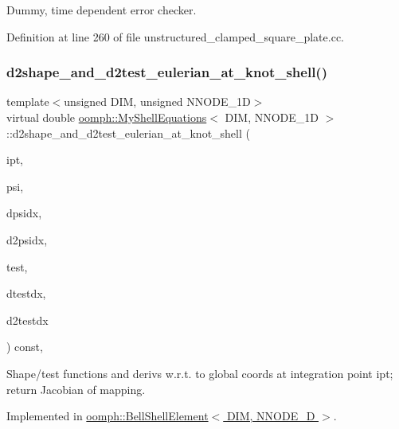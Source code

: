 Dummy, time dependent error checker. 



Definition at line 260 of file unstructured\+\_\+clamped\+\_\+square\+\_\+plate.\+cc.

\mbox{\label{classoomph_1_1MyShellEquations_af8f15f0d678c85535bbc3390399dafdd}} 
\subsubsection{\texorpdfstring{d2shape\+\_\+and\+\_\+d2test\+\_\+eulerian\+\_\+at\+\_\+knot\+\_\+shell()}{d2shape\_and\_d2test\_eulerian\_at\_knot\_shell()}}
{\footnotesize\ttfamily template$<$unsigned D\+IM, unsigned N\+N\+O\+D\+E\+\_\+1D$>$ \\
virtual double \hyperlink{classoomph_1_1MyShellEquations}{oomph\+::\+My\+Shell\+Equations}$<$ D\+IM, N\+N\+O\+D\+E\+\_\+1D $>$\+::d2shape\+\_\+and\+\_\+d2test\+\_\+eulerian\+\_\+at\+\_\+knot\+\_\+shell (\begin{DoxyParamCaption}\item[{const unsigned \&}]{ipt,  }\item[{Shape \&}]{psi,  }\item[{D\+Shape \&}]{dpsidx,  }\item[{D\+Shape \&}]{d2psidx,  }\item[{Shape \&}]{test,  }\item[{D\+Shape \&}]{dtestdx,  }\item[{D\+Shape \&}]{d2testdx }\end{DoxyParamCaption}) const\hspace{0.3cm}{\ttfamily [protected]}, {}}



Shape/test functions and derivs w.\+r.\+t. to global coords at integration point ipt; return Jacobian of mapping. 



Implemented in \hyperlink{classoomph_1_1BellShellElement_a00932feabc5283a7edbff0cf8c52eb67}{oomph\+::\+Bell\+Shell\+Element$<$ D\+I\+M, N\+N\+O\+D\+E\+\_\+D $>$}.

